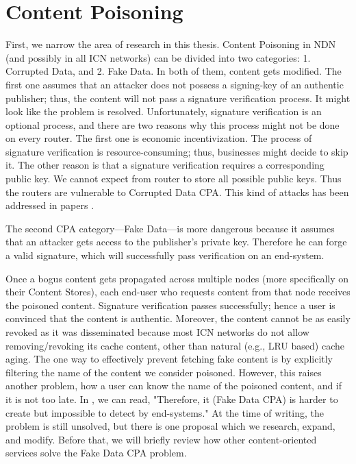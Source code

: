 \chapter{Content Poisoning}
\label{content-poisoning}
First, we narrow the area of research in this thesis. Content Poisoning in NDN (and possibly in all ICN networks) can be divided into two categories: 1. Corrupted Data, and 2. Fake Data. In both of them, content gets modified. The first one assumes that an attacker does not possess a signing-key of an authentic publisher; thus, the content will not pass a signature verification process. It might look like the problem is resolved. Unfortunately, signature verification is an optional process, and there are two reasons why this process might not be done on every router. The first one is economic incentivization. The process of signature verification is resource-consuming; thus, businesses might decide to skip it. The other reason is that a signature verification requires a corresponding public key. We cannot expect from router to store all possible public keys. Thus the routers are vulnerable to Corrupted Data CPA. This kind of attacks has been addressed in papers \cite{ghali2014needle} \cite{yu2018content} \cite{nguyen2017content}. 

The second CPA category––Fake Data––is more dangerous because it assumes that an attacker gets access to the publisher's private key. Therefore he can forge a valid signature, which will successfully pass verification on an end-system. 

Once a bogus content gets propagated across multiple nodes (more specifically on their Content Stores), each end-user who requests content from that node receives the poisoned content. Signature verification passes successfully; hence a user is convinced that the content is authentic. Moreover, the content cannot be as easily revoked as it was disseminated because most ICN networks do not allow removing/revoking its cache content, other than natural (e.g., LRU based) cache aging. The one way to effectively prevent fetching fake content is by explicitly filtering the name of the content we consider poisoned. However, this raises another problem, how a user can know the name of the poisoned content, and if it is not too late. In \cite{nguyen2017content}, we can read, "Therefore, it (Fake Data CPA) is harder to create but impossible to detect by end-systems." At the time of writing, the problem is still unsolved, but there is one proposal \cite{konorski2019mitigating} which we research, expand, and modify. Before that, we will briefly review how other content-oriented services solve the Fake Data CPA problem.

